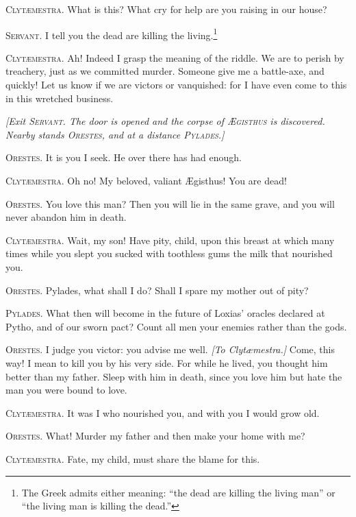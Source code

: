 \documentclass[12pt]{article}
\begin{document}
\textsc{Clyt{\ae}mestra.} What is this? What cry for help are you raising in our house?

\textsc{Servant.} I tell you the dead are killing the living.\footnote{The Greek admits either meaning: ``the dead are killing the living man'' or ``the living man is killing the dead.''}

\textsc{Clyt{\ae}mestra.} Ah! Indeed I grasp the meaning of the riddle. We are to perish by treachery, just as we committed murder. Someone give me a battle-axe, and quickly! Let us know if we are victors or vanquished: for I have even come to this in this wretched business.

\begin{center}
\textit{[Exit \textsc{Servant.} The door is opened and the corpse of \textsc{{\AE}gisthus} is discovered.\\
Nearby stands \textsc{Orestes,} and at a distance \textsc{Pylades.}]}
\end{center}

\textsc{Orestes.} It is you I seek. He over there has had enough.

\textsc{Clyt{\ae}mestra.} Oh no! My beloved, valiant {\AE}gisthus! You are dead!

\textsc{Orestes.} You love this man? Then you will lie in the same grave, and you will never abandon him in death.

\textsc{Clyt{\ae}mestra.} Wait, my son! Have pity, child, upon this breast at which many times while you slept you sucked with toothless gums the milk that nourished you.

\textsc{Orestes.} Pylades, what shall I do? Shall I spare my mother out of pity?

\textsc{Pylades.} What then will become in the future of Loxias' oracles declared at Pytho, and of our sworn pact? Count all men your enemies rather than the gods.

\textsc{Orestes.} I judge you victor: you advise me well. \textit{[To Clyt{\ae}mestra.]} Come, this way! I mean to kill you by his very side. For while he lived, you thought him better than my father. Sleep with him in death, since you love him but hate the man you were bound to love.

\textsc{Clyt{\ae}mestra.} It was I who nourished you, and with you I would grow old.

\textsc{Orestes.} What! Murder my father and then make your home with me?

\textsc{Clyt{\ae}mestra.} Fate, my child, must share the blame for this.
\end{document}
